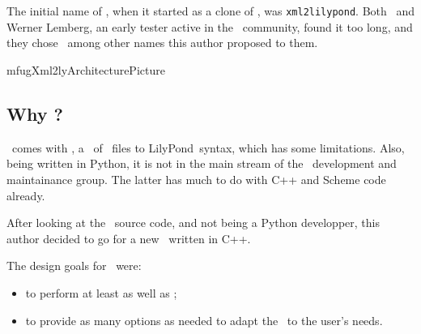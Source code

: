 



\chapter{\xmlToLy\ }

The initial name of \xmlToLy, when it started as a clone of \xmlToGuido, was {\tt xml2lilypond}. Both \fober\ and Werner Lemberg, an early tester active in the \lily\ community, found it too long, and they chose \xmlToLy\ among other names this author proposed to them.

{mfugXml2lyArchitecturePicture}


\section{Why \xmlToLy?}

\lily\ comes with \mxmlToLy, a \converter\ of \mxml\ files to LilyPond\ syntax, which has some limitations. Also, being written in Python, it is not in the main stream of the \lily\ development and maintainance group. The latter has much to do with C++ and Scheme code already.

After looking at the \mxmlToLy\ source code, and not being a Python developper, this author decided to go for a new \converter\ written in C++.

The design goals for \xmlToLy\ were:
\begin{itemize}
\item to perform at least as well as \mxmlToLy;
\item to provide as many options as needed to adapt the \lcg\ to the user's needs.
\end{itemize}

